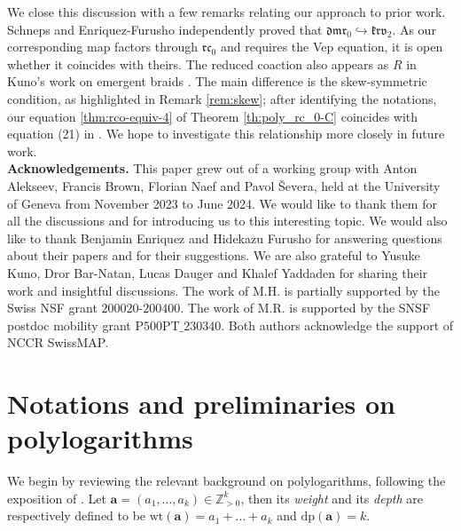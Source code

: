 \documentclass[a4paper,fleqn]{cas-sc}
\newcommand{\Z}{\mathbb{Z}}
\newcommand{\rc}{\mathfrak{rc}}
\newcommand{\krv}{\mathfrak{krv}}
\begin{document}
We close this discussion with a few remarks relating our approach to prior work. Schneps \cite{Schneps2025} and Enriquez-Furusho \cite{EF4} independently proved that $\mathfrak{dmr}_0 \hookrightarrow \krv_2$. As our corresponding map factors through $\rc_0$ and requires the Vep equation, it is open whether it coincides with theirs.
The reduced coaction also appears as $R$ in Kuno's work on emergent braids \cite{Kuno2025}. %
The main difference is the skew-symmetric condition, as highlighted in Remark \ref{rem:skew}; after identifying the notations, our equation \eqref{thm:rco-equiv-4} of Theorem \ref{th:poly_rc_0-C} coincides with equation (21) in \cite{Kuno2025}.  We hope to investigate this relationship more closely in future work. \\
 


{\bf Acknowledgements.} This paper grew out of a working group with Anton Alekseev, Francis Brown, Florian Naef and Pavol \v{S}evera, held at the University of Geneva from November 2023 to June 2024. We would like to thank them for all the discussions and for introducing us to this interesting topic. We would also like to thank Benjamin Enriquez and Hidekazu Furusho for answering questions about their papers and for their suggestions. We are also grateful to Yusuke Kuno, Dror Bar-Natan, Lucas Dauger and Khalef Yaddaden for sharing their work and insightful discussions. 
The work of M.H. is partially supported by the Swiss NSF grant $200020$-$200400$. The work of M.R. is supported by the SNSF postdoc mobility grant  P$500$PT$\_230340$. Both authors acknowledge the support of NCCR SwissMAP.

\renewcommand{\thetheorem}{\arabic{theorem}}
\setcounter{theorem}{3}

\section{Notations and preliminaries on polylogarithms}
\label{section:notation_polylogarithms}
We begin by reviewing the relevant background on polylogarithms, following the exposition of \cite{Furusho2011}. Let $\textbf{a}=(a_1,\dots,a_k)\in \Z^k_{>0}$, then its \textit{weight} and its \textit{depth} are respectively defined to be $\text{wt}(\textbf{a})=a_1+\dots+a_k$ and $\text{dp}(\textbf{a})=k$. %
\end{document}
